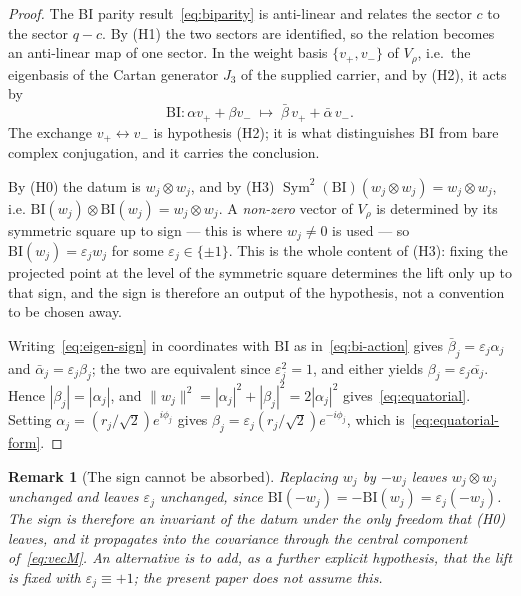 \documentclass[11pt,a4paper]{article}
\newtheorem{remark}[theorem]{Remark}
\DeclareMathOperator{\Sym}{Sym}
\newcommand{\BI}{\mathrm{BI}}
\begin{document}
  \begin{proof}
    The BI parity result~\eqref{eq:biparity} is anti-linear and relates the sector $c$ to the
    sector $q-c$.
    By (H1) the two sectors are identified, so the relation becomes an anti-linear map of one
    sector.
    In the weight basis $\{v_+, v_-\}$ of $V_\rho$, i.e.\ the eigenbasis of the Cartan generator
    $J_3$ of the supplied carrier, and by (H2), it acts by
    \begin{equation}
      \label{eq:bi-action}
      \BI \colon \alpha v_+ + \beta v_- \;\longmapsto\; \bar\beta\, v_+ + \bar\alpha\, v_- .
    \end{equation}
    The exchange $v_+ \leftrightarrow v_-$ is hypothesis (H2); it is what distinguishes $\BI$ from
    bare complex conjugation, and it carries the conclusion.

    By (H0) the datum is $w_j \otimes w_j$, and by (H3)
    $\Sym^2(\BI)(w_j \otimes w_j) = w_j \otimes w_j$, i.e.
    $\BI(w_j) \otimes \BI(w_j) = w_j \otimes w_j$.
    A \emph{non-zero} vector of $V_\rho$ is determined by its symmetric square up to sign --- this
    is where $w_j \neq 0$ is used --- so $\BI(w_j) = \varepsilon_j w_j$ for some
    $\varepsilon_j \in \{\pm 1\}$.
    This is the whole content of (H3): fixing the projected point at the level of the symmetric
    square determines the lift only up to that sign, and the sign is therefore an output of the
    hypothesis, not a convention to be chosen away.

    Writing~\eqref{eq:eigen-sign} in coordinates with $\BI$ as in~\eqref{eq:bi-action} gives
    $\bar\beta_j = \varepsilon_j \alpha_j$ and $\bar\alpha_j = \varepsilon_j \beta_j$; the two are
    equivalent since $\varepsilon_j^2 = 1$, and either yields
    $\beta_j = \varepsilon_j \overline{\alpha_j}$.
    Hence $|\beta_j| = |\alpha_j|$, and $\|w_j\|^2 = |\alpha_j|^2 + |\beta_j|^2 = 2|\alpha_j|^2$
    gives~\eqref{eq:equatorial}.
    Setting $\alpha_j = (r_j/\!\sqrt{2}) e^{i\phi_j}$ gives
    $\beta_j = \varepsilon_j (r_j/\!\sqrt{2}) e^{-i\phi_j}$, which
    is~\eqref{eq:equatorial-form}.
  \end{proof}

  \begin{remark}[The sign cannot be absorbed]
    \label{rem:sign}
    Replacing $w_j$ by $-w_j$ leaves $w_j \otimes w_j$ unchanged and leaves $\varepsilon_j$
    unchanged, since $\BI(-w_j) = -\BI(w_j) = \varepsilon_j(-w_j)$.
    The sign is therefore an invariant of the datum under the only freedom that (H0) leaves, and it
    propagates into the covariance through the central component
    of~\eqref{eq:vecM}.
    An alternative is to add, as a further explicit hypothesis, that the lift is fixed with
    $\varepsilon_j \equiv +1$; the present paper does not assume this.
  \end{remark}
\end{document}
